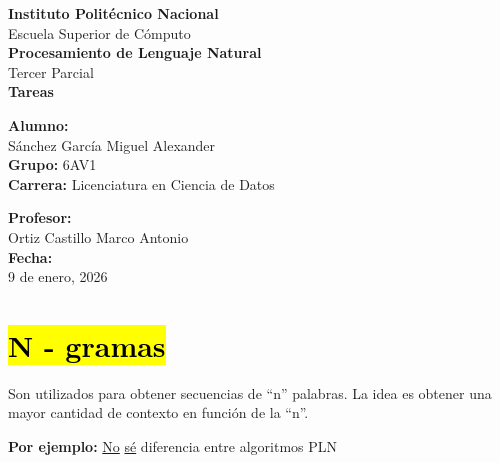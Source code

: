 \documentclass[12pt]{article}
\begin{document}
\thispagestyle{empty}

\begin{center}

{\LARGE \textbf{Instituto Politécnico Nacional}}\\[0.5cm]
{\large Escuela Superior de Cómputo}\\[1.5cm]



{\Huge \textbf{Procesamiento de Lenguaje Natural}}\\[0.5cm]
{\large Tercer Parcial}\\[2cm]

{\LARGE \textbf{Tareas}}\\[0.5cm]

\end{center}

\vfill

\begin{minipage}{0.55\textwidth}
\textbf{Alumno:}\\
Sánchez García Miguel Alexander\\[1cm]

\textbf{Grupo:} 6AV1\\
\textbf{Carrera:} Licenciatura en Ciencia de Datos
\end{minipage}
\hfill
\begin{minipage}{0.35\textwidth}
\textbf{Profesor:}\\
Ortiz Castillo Marco Antonio\\[1cm]

\textbf{Fecha:}\\
9 de enero, 2026
\end{minipage}

\newpage


\section*{\hl{N - gramas}}

Son utilizados para obtener secuencias de ``n'' palabras. La idea es obtener una mayor cantidad de contexto en función de la ``n''.

\vspace{1em}

\textbf{Por ejemplo:} \underline{No} \underline{sé} diferencia entre algoritmos PLN

\vspace{1em}
\end{document}
